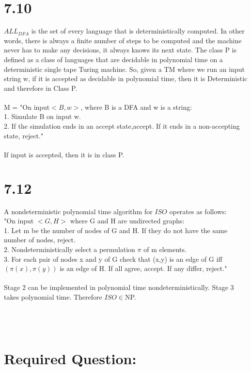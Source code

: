 \documentclass{scrartcl}
\begin{document}
\section*{7.10}
$ALL_{DFA}$ is the set of every language that is deterministically computed. In other words, there is always a finite number of steps to be computed and the machine never has to make any decisions, it always knows its next state. The class P is defined as a class of languages that are decidable in polynomial time on a deterministic single tape Turing machine. So, given a TM where we run an input string w, if it is accepted as decidable in polynomial time, then it is Deterministic and therefore in Class P.
\\
\\
M = "On input$<B,w>$, where B is a DFA and w is a string:\\
1. Simulate B on input w.\\
2. If the simulation ends in an accept state,accept. If it ends in a non-accepting state, reject."\\
\\
If input is accepted, then it is in class P.



\section*{7.12}
A nondeterministic polynomial time algorithm for $ISO$ operates as follows:\\
"On input $<G,H>$ where G and H are undirected graphs:\\
1. Let m be the number of nodes of G and H. If they do not have the same number of nodes, reject.\\
2. Nondeterministically select a permulation $\pi$ of m elements.\\
3. For each pair of nodes x and y of G check that (x,y) is an edge of G iff $(\pi(x),\pi(y))$ is an edge of H. If all agree, accept. If any differ, reject."\\
\\
Stage 2 can be implemented in polynomial time nondeterministically. Stage 3 takes polynomial time. Therefore $ISO \in $NP.
\\
\\
\\
\\
\section*{Required Question:}
\end{document}
